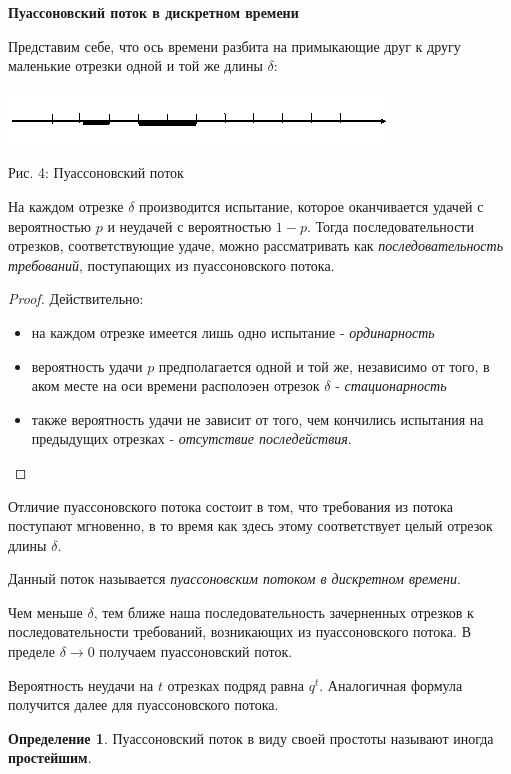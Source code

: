 \documentclass[aps,%
12pt,%
final,%
oneside,
onecolumn,%
musixtex, %
superscriptaddress,%
centertags]{article} %
\theoremstyle{plain}
\theoremstyle{definition}
\newtheorem{definition}{Определение}[subsection]
\theoremstyle{remark}
\begin{document}
\textbf{Пуассоновский поток в дискретном времени}

Представим себе, что ось времени разбита на примыкающие друг к другу маленькие отрезки одной и той же длины $\delta$:
\begin{center}
  \includegraphics[scale=0.5]{images/4.png}

  Рис. 4: Пуассоновский поток
\end{center}

На каждом отрезке $\delta$ производится испытание, которое оканчивается удачей с вероятностью $p$ и неудачей с вероятностью $1-p$. Тогда последовательности отрезков, соответствующие удаче, можно рассматривать как \textit{последовательность требований}, поступающих из пуассоновского потока.

\begin{proof}
	Действительно:

	\begin{itemize}
		\item на каждом отрезке имеется лишь одно испытание - \textit{ординарность}
		\item вероятность удачи $p$ предполагается одной и той же, независимо от того, в аком месте на оси времени располоэен отрезок $\delta$ - \textit{стационарность}
		\item также вероятность удачи не зависит от того, чем кончились испытания на предыдущих отрезках - \textit{отсутствие последействия}.
	\end{itemize}
\end{proof}

Отличие пуассоновского потока состоит в том, что требования из потока поступают мгновенно, в то время как здесь этому соответствует целый отрезок длины $\delta$.

Данный поток называется \textit{пуассоновским потоком в дискретном времени}.

Чем меньше $\delta$, тем ближе наша последовательность зачерненных отрезков к последовательности требований, возникающих из пуассоновского потока. В пределе $\delta \to 0$ получаем пуассоновский поток.

Вероятность неудачи на $t$ отрезках подряд равна $q^t$. Аналогичная формула получится далее для пуассоновского потока.

\begin{definition}
	Пуассоновский поток в виду своей простоты называют иногда \textbf{простейшим}.
\end{definition}
\end{document}
